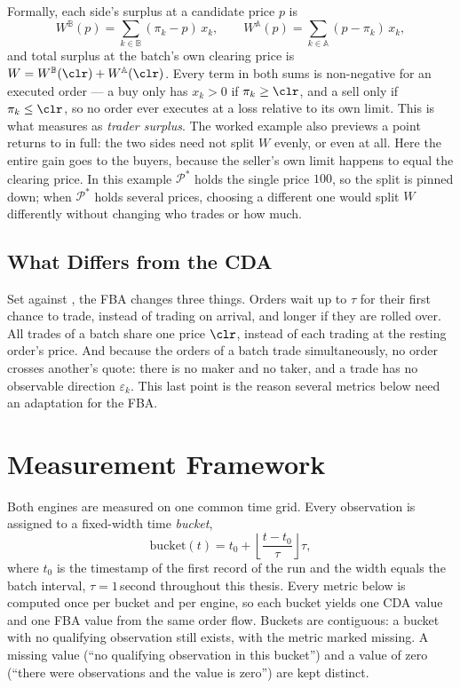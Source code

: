 Formally, each side's surplus at a candidate price $p$ is
\begin{equation}
  \label{eq:surplus}
  W^{\mathbb{B}}(p) = \sum_{k \in \mathbb{B}} (\pi_k - p)\, x_k,
  \qquad
  W^{\mathbb{A}}(p) = \sum_{k \in \mathbb{A}} (p - \pi_k)\, x_k,
\end{equation}
and total surplus at the batch's own clearing price is $W =
W^{\mathbb{B}}(\clr) + W^{\mathbb{A}}(\clr)$. Every
term in both sums is non-negative for an executed order --- a buy only
has $x_k>0$ if $\pi_k \ge \clr$, and a sell only if $\pi_k \le \clr$, so
no order ever executes at a loss relative to its own limit. This is what
 measures as \emph{trader surplus}. The worked example
also previews a point  returns to in full: the
two sides need not split $W$ evenly, or even at all. Here the entire
gain goes to the buyers, because the seller's own limit happens to equal
the clearing price. In this example $\mathcal{P}^{*}$ holds the single
price $100$, so the split is pinned down; when $\mathcal{P}^{*}$ holds
several prices, choosing a different one would split $W$ differently
without changing who trades or how much.

\subsection{What Differs from the CDA}

Set against , the FBA changes three things. Orders
wait up to $\tau$ for their first chance to trade, instead of trading on
arrival, and longer if they are rolled over.
All trades of a batch share one price $\clr$, instead of each trading at
the resting order's price. And because the orders of a batch trade
simultaneously, no order crosses another's quote: there is no maker and
no taker, and a trade has no observable direction $\varepsilon_k$. This last point
is the reason several metrics below need an adaptation for the FBA.

\section{Measurement Framework}
\label{sec:measurement}

Both engines are measured on one common time grid. Every observation is
assigned to a fixed-width time \emph{bucket},
\begin{equation}
  \label{eq:bucket}
  \mathrm{bucket}(t) = t_0 + \left\lfloor \frac{t - t_0}{\tau} \right\rfloor \tau,
\end{equation}
where $t_0$ is the timestamp of the first record of the run and the
width equals the batch interval, $\tau = 1$\,second throughout this
thesis. Every metric below is computed once per bucket and per engine, so
each bucket yields one CDA value and one FBA value from the same order
flow. Buckets are contiguous: a bucket with no qualifying observation
still exists, with the metric marked missing. A missing value (``no
qualifying observation in this bucket'') and a value of zero (``there were
observations and the value is zero'') are kept distinct.


